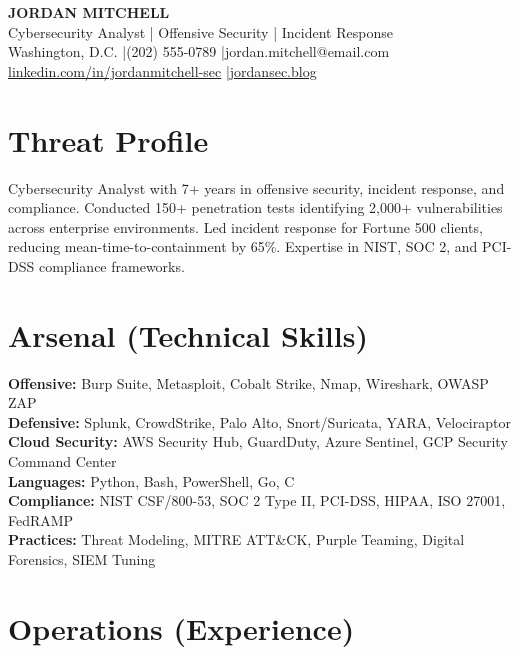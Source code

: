 \documentclass[9.5pt,a4paper]{article}
\begin{document}
\begin{tcolorbox}[colback=darkbg,colframe=accent,boxrule=1.5pt,arc=0pt,left=10pt,right=10pt,top=8pt,bottom=8pt]
{\color{accent}\fontsize{18}{22}\selectfont\bfseries JORDAN MITCHELL}\\[3pt]
{\color{white}\small Cybersecurity Analyst | Offensive Security | Incident Response}\\[4pt]
{\color{lightgray}\small Washington, D.C. \quad|\quad (202) 555-0789 \quad|\quad jordan.mitchell@email.com}\\[2pt]
{\color{lightgray}\small \href{https://linkedin.com/in/jordanmitchell-sec}{linkedin.com/in/jordanmitchell-sec} \quad|\quad \href{https://jordansec.blog}{jordansec.blog}}
\end{tcolorbox}

\vspace{4pt}

\section{Threat Profile}
Cybersecurity Analyst with 7+ years in offensive security, incident response, and compliance. Conducted 150+ penetration tests identifying 2,000+ vulnerabilities across enterprise environments. Led incident response for Fortune 500 clients, reducing mean-time-to-containment by 65\%. Expertise in NIST, SOC 2, and PCI-DSS compliance frameworks.

\section{Arsenal (Technical Skills)}
\textbf{Offensive:} Burp Suite, Metasploit, Cobalt Strike, Nmap, Wireshark, OWASP ZAP\\
\textbf{Defensive:} Splunk, CrowdStrike, Palo Alto, Snort/Suricata, YARA, Velociraptor\\
\textbf{Cloud Security:} AWS Security Hub, GuardDuty, Azure Sentinel, GCP Security Command Center\\
\textbf{Languages:} Python, Bash, PowerShell, Go, C\\
\textbf{Compliance:} NIST CSF/800-53, SOC 2 Type II, PCI-DSS, HIPAA, ISO 27001, FedRAMP\\
\textbf{Practices:} Threat Modeling, MITRE ATT\&CK, Purple Teaming, Digital Forensics, SIEM Tuning

\section{Operations (Experience)}
\end{document}
